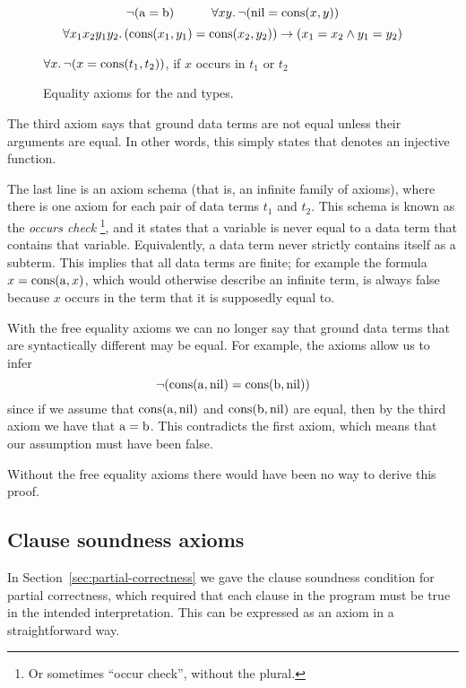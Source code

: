 \begin{figure}
\[
    \lnot (\operatorname{a} = \operatorname{b})
    \qquad\quad
    \forall x y.\, \lnot (\operatorname{nil} = \operatorname{cons}(x, y))
\]
\[
    \forall x_1 x_2 y_1 y_2.\,
    (\operatorname{cons}(x_1, y_1) = \operatorname{cons}(x_2, y_2))
    \rightarrow
    (x_1 = x_2 \land y_1 = y_2)
\]
\begin{center}
$\forall x.\, \lnot (x = \operatorname{cons}(t_1, t_2))$,
if $x$ occurs in $t_1$ or $t_2$
\end{center}
\caption{Equality axioms for the  and  types.
\label{fig:ax-foobar}}
\end{figure}

The third axiom says that
ground data terms are not equal
unless their arguments are equal.
In other words,
this simply states that
 denotes an injective function.

The last line is an axiom schema
(that is, an infinite family of axioms),
where there is one axiom for each pair of data terms $t_1$ and $t_2$.
This schema is known as the \emph{occurs check\label{gi:occurs-check}}%
\footnote{
Or sometimes ``occur check'', without the plural.
},
and it states that a variable is never equal to
a data term that contains that variable.
Equivalently,
a data term never strictly contains itself as a subterm.
This implies that all data terms are finite;
for example the formula $x = \operatorname{cons}(\operatorname{a}, x)$,
which would otherwise describe an infinite term,
is always false because $x$ occurs in the term
that it is supposedly equal to.

With the free equality axioms we can no longer say that
ground data terms that are syntactically different may be equal.
For example, the axioms allow us to infer
\[
    \lnot (\operatorname{cons}(\operatorname{a}, \operatorname{nil}) = \operatorname{cons}(\operatorname{b}, \operatorname{nil}))
\]
since if we assume that
$\operatorname{cons}(\operatorname{a}, \operatorname{nil})$
and
$\operatorname{cons}(\operatorname{b}, \operatorname{nil})$
are equal,
then by the third axiom we have that $\operatorname{a} = \operatorname{b}$.
This contradicts the first axiom,
which means that our assumption must have been false.

Without the free equality axioms there would have been
no way to derive this proof.


\subsection{Clause soundness axioms}
\label{sec:ax-clause-soundness}

In Section~\ref{sec:partial-correctness}
we gave the clause soundness condition
for partial correctness,
which required that each clause in the program
must be true in the intended interpretation.
This can be expressed as an axiom
in a straightforward way.

